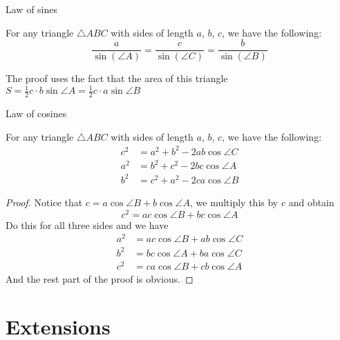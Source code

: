 \documentclass{article}
\begin{document}
\begin{myleftlinebox}
	Law of sines
	\tcblower
	\begin{theorem}
		For any triangle $\triangle ABC$ with sides of length $a$, $b$, $c$, we have the following:
		\[\frac{a}{\sin(\angle A)}=\frac{c}{\sin(\angle C)}=\frac{b}{\sin(\angle B)}\]
		\begin{center}
		\end{center}
	\end{theorem}
	The proof uses the fact that the area of this triangle $S=\frac{1}{2}c\cdot b\sin\angle A=\frac{1}{2}c\cdot a\sin\angle B$
\end{myleftlinebox}

\begin{myleftlinebox}
	Law of cosines
	\tcblower
	\begin{theorem}
		For any triangle $\triangle ABC$ with sides of length $a$, $b$, $c$, we have the following:
		\begin{align*}
			c^2 &= a^2+b^2 -2ab\cos\angle C\\
			a^2 &= b^2+c^2 -2bc\cos\angle A\\
			b^2 &= c^2+a^2 -2ca\cos\angle B
		\end{align*}
	\end{theorem}
	\begin{proof}
		Notice that $c=a\cos\angle B+b\cos\angle A$, we multiply this by $c$ and obtain
		\[c^2=ac\cos\angle B+bc\cos\angle A\]
		Do this for all three sides and we have
		\begin{align*}
			a^2 &= ac\cos\angle B+ab\cos\angle C\\
			b^2 &= bc\cos\angle A+ba\cos\angle C\\
			c^2 &= ca\cos\angle B+cb\cos\angle A
		\end{align*}
		And the rest part of the proof is obvious.
	\end{proof}
\end{myleftlinebox}

\section{Extensions}
\end{document}
